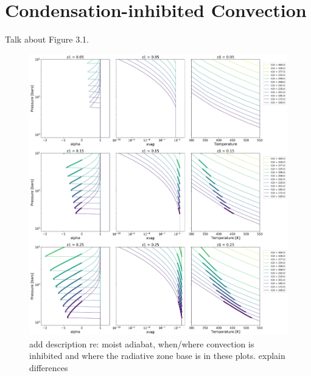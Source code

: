 \documentclass[11pt]{ucscthesisbs}
\begin{document}
\section{Condensation-inhibited Convection}
Talk about Figure 3.1.
\begin{figure}[ht!]
 \centerline{
  \includegraphics[width=7.0in]{figures/convection_inhibited_2.png}
 }
\caption[Inhibition of convection on Uranus]
{add description re: moist adiabat, when/where convection is inhibited and where the radiative zone base is in these plots. explain differences}
\label{fig:convection_inhibited}
\end{figure}
\end{document}
